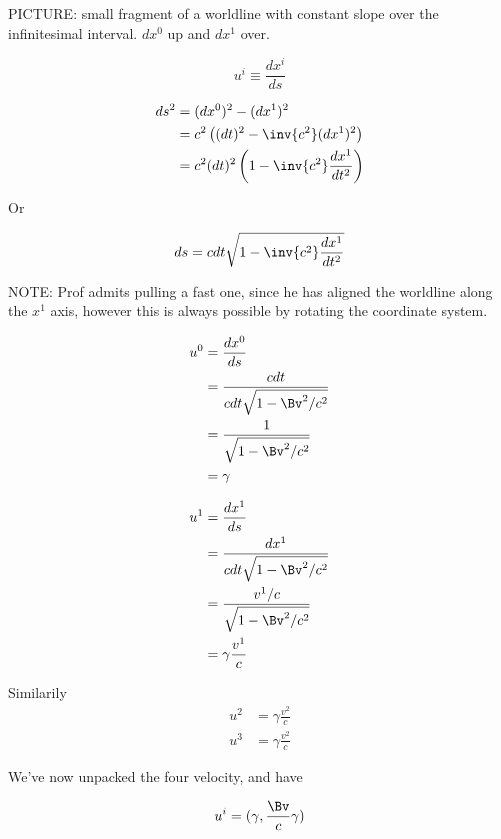 PICTURE: small fragment of a worldline with constant slope over the infinitesimal interval.  $dx^0$ up and $dx^1$ over.

\begin{equation}\label{eqn:relativisticElectrodynamicsL7:70}
u^i \equiv \frac{dx^i}{ds}
\end{equation}

\begin{align*}
ds^2 
&= (dx^0)^2 - (dx^1)^2 \\
&= c^2 \left( (dt)^2 - \inv{c^2} (dx^1)^2 \right) \\
&= c^2 (dt)^2 \left( 1 - \inv{c^2} \frac{dx^1}{dt^2} \right) 
\end{align*}

Or 

\begin{align}\label{eqn:relativisticElectrodynamicsL7:90}
ds = c dt \sqrt{1 - \inv{c^2} \frac{dx^1}{dt^2} }
\end{align}

NOTE: Prof admits pulling a fast one, since he has aligned the worldline along the $x^1$ axis, however this is always possible by rotating the coordinate system.

\begin{align*}
u^0 
&= \frac{dx^0}{ds} \\
&= \frac{c dt}{ c dt \sqrt{ 1 - \Bv^2/c^2} } \\
&= \frac{1}{ \sqrt{ 1 - \Bv^2/c^2} } \\
&= \gamma
\end{align*}

\begin{align*}
u^1 
&= \frac{dx^1}{ds} \\
&= \frac{dx^1 }{ c dt \sqrt{ 1 - \Bv^2/c^2} } \\
&= \frac{v^1/c}{ \sqrt{ 1 - \Bv^2/c^2} } \\
&= \gamma \frac{v^1}{c}
\end{align*}

Similarily
\begin{align*}
u^2 &= \gamma \frac{v^2}{c} \\
u^3 &= \gamma \frac{v^2}{c}
\end{align*}

We've now unpacked the four velocity, and have

\begin{equation}\label{eqn:relativisticElectrodynamicsL7:100}
u^i = ( \gamma, \frac{\Bv}{c} \gamma )
\end{equation}

